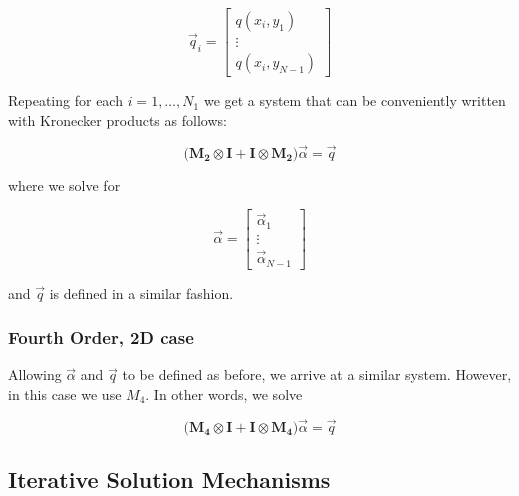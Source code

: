 \begin{equation*}
\Vec{q}_i = 
     \begin{bmatrix}
        q(x_i,y_1) \\
        \vdots \\
        q(x_i, y_{N-1}) 
    \end{bmatrix}  
\end{equation*}

Repeating for each $i = 1, \ldots, N_1$ we get a system that can be conveniently written with Kronecker products as follows:

\begin{equation*}
\big( \mathbf{M_2} \otimes \mathbf{I} +  \mathbf{I} \otimes \mathbf{M_2} \big) \Vec{\alpha} = \Vec{q}
\end{equation*}

where we solve for 

\begin{equation*}
\Vec{\alpha} = 
     \begin{bmatrix}
        \Vec{\alpha}_1 \\
        \vdots \\
        \Vec{\alpha}_{N-1}
    \end{bmatrix}  
\end{equation*}

and $\Vec{q}$ is defined in a similar fashion. 

\subsubsection{Fourth Order, 2D case}

Allowing $\Vec{\alpha}$ and $\Vec{q}$ to be defined as before, we arrive at a similar system. However, in this case we use $M_4$. In other words, we solve

\begin{equation*}
\big( \mathbf{M_4} \otimes \mathbf{I} +  \mathbf{I} \otimes \mathbf{M_4} \big) \Vec{\alpha} = \Vec{q}
\end{equation*}

\subsection{Iterative Solution Mechanisms}

